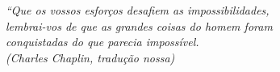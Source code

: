 \begin{epigrafe}
    \vspace*{\fill}
	\begin{flushright}
		\textit{``Que os vossos esforços desafiem as impossibilidades,\\
		lembrai-vos de que as grandes coisas do homem foram \\
		conquistadas do que parecia impossível.\\
		(Charles Chaplin, tradução nossa)}
	\end{flushright}
\end{epigrafe}
